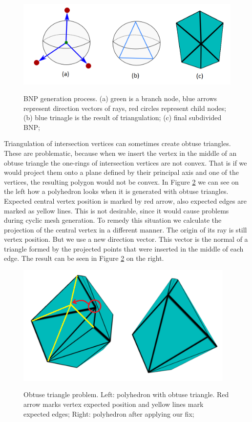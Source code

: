 \begin{figure}[h]
    \centering
    \includegraphics[width=\textwidth]{images/bnp_gen_ilu.png}
    \label{fig:bnp_gen_ilu}
    \caption[BNP generation process]{BNP generation process. (a) green is a branch node, blue arrows represent direction vectors of rays, red circles represent child nodes; (b) blue trinagle is the result of triangulation; (c) final subdivided BNP;}
\end{figure}

Triangulation of intersection vertices can sometimes create obtuse triangles. These are problematic, because when we insert the vertex in the middle of an obtuse triangle the one-rings of intersection vertices are not convex. That is if we would project them onto a plane defined by their principal axis and one of the vertices, the resulting polygon would not be convex. In Figure \ref{fig:obtus_tri_ilu} we can see on the left how a polyhedron looks when it is generated with obtuse triangles. Expected central vertex position is marked by red arrow, also expected edges are marked as yellow lines. This is not desirable, since it would cause problems during cyclic mesh generation. To remedy this situation we calculate the projection of the central vertex in a different manner. The origin of its ray is still vertex position. But we use a new direction vector. This vector is the normal of a triangle formed by the projected points that were inserted in the middle of each edge. The result can be seen in Figure \ref{fig:obtus_tri_ilu} on the right.

\begin{figure}[h]
    \centering
    \includegraphics[height=6cm]{images/obtuse_triangle_fix_ilu.png}
    \label{fig:obtus_tri_ilu}
    \caption[Obtuse triangle problem]{Obtuse triangle problem. Left: polyhedron with obtuse triangle. Red arrow marks vertex expected position and yellow lines mark expected edges; Right: polyhedron after applying our fix;}
\end{figure}

